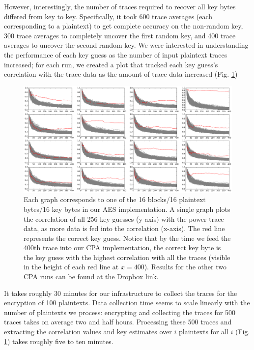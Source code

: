 \documentclass[journal]{ieee_style}
\begin{document}
However, interestingly, the number of traces required to recover all key bytes differed from key to key. Specifically, it took 600 trace averages (each corresponding to a plaintext) to get complete accuracy on the non-random key, 300 trace averages to completely uncover the first random key, and 400 trace averages to uncover the second random key. We were interested in understanding the performance of each key guess as the number of input plaintext traces increased; for each run, we created a plot that tracked each key guess's correlation with the trace data as the amount of trace data increased (Fig. \ref{results_random2})

\begin{figure}[!t]
\centering
\includegraphics[width=7in]{12-04-15-19-46-23-newrandomkey2-corr-evolution}
\caption{Each graph corresponds to one of the 16 blocks/16 plaintext bytes/16 key bytes in our AES implementation. A single graph plots the correlation of all 256 key guesses (y-axis) with the power trace data, as more data is fed into the correlation (x-axis). The red line represents the correct key guess. Notice that by the time we feed the 400th trace into our CPA implementation, the correct key byte is the key guess with the highest correlation with all the traces (visible in the height of each red line at $x=400$). Results for the other two CPA runs can be found at the Dropbox link.}
\label{results_random2}
\end{figure}

It takes roughly 30 minutes for our infrastructure to collect the traces for the encryption of 100 plaintexts. Data collection time seems to scale linearly with the number of plaintexts we process: encrypting and collecting the traces for 500 traces takes on average two and half hours. Processing these 500 traces and extracting the correlation values and key estimates over $i$ plaintexts for all $i$ (Fig. \ref{results_random2}) takes roughly five to ten minutes.
\end{document}

